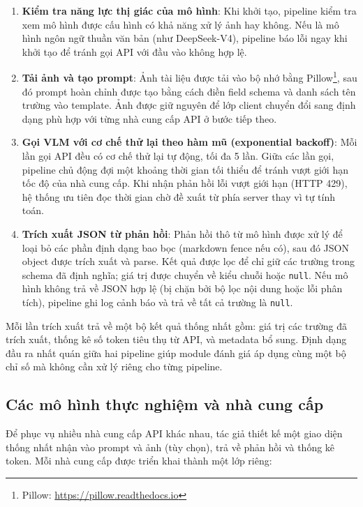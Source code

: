 ﻿\documentclass[12pt]{report}
\begin{document}
\begin{enumerate}
    \item \textbf{Kiểm tra năng lực thị giác của mô hình}: Khi khởi tạo, pipeline kiểm tra xem mô hình được cấu hình có khả năng xử lý ảnh hay không. Nếu là mô hình ngôn ngữ thuần văn bản (như DeepSeek-V4), pipeline báo lỗi ngay khi khởi tạo để tránh gọi API với đầu vào không hợp lệ.

    \item \textbf{Tải ảnh và tạo prompt}: Ảnh tài liệu được tải vào bộ nhớ bằng Pillow\footnote{Pillow: \url{https://pillow.readthedocs.io}}, sau đó prompt hoàn chỉnh được tạo bằng cách điền field schema và danh sách tên trường vào template. Ảnh được giữ nguyên để lớp client chuyển đổi sang định dạng phù hợp với từng nhà cung cấp API ở bước tiếp theo.

    \item \textbf{Gọi VLM với cơ chế thử lại theo hàm mũ (exponential backoff)}: Mỗi lần gọi API đều có cơ chế thử lại tự động, tối đa 5 lần. Giữa các lần gọi, pipeline chủ động đợi một khoảng thời gian tối thiểu để tránh vượt giới hạn tốc độ của nhà cung cấp. Khi nhận phản hồi lỗi vượt giới hạn (HTTP 429), hệ thống ưu tiên đọc thời gian chờ đề xuất từ phía server thay vì tự tính toán.

    \item \textbf{Trích xuất JSON từ phản hồi}: Phản hồi thô từ mô hình được xử lý để loại bỏ các phần định dạng bao bọc (markdown fence nếu có), sau đó JSON object được trích xuất và parse. Kết quả được lọc để chỉ giữ các trường trong schema đã định nghĩa; giá trị được chuyển về kiểu chuỗi hoặc \texttt{null}. Nếu mô hình không trả về JSON hợp lệ (bị chặn bởi bộ lọc nội dung hoặc lỗi phân tích), pipeline ghi log cảnh báo và trả về tất cả trường là \texttt{null}.
\end{enumerate}

Mỗi lần trích xuất trả về một bộ kết quả thống nhất gồm: giá trị các trường đã trích xuất, thống kê số token tiêu thụ từ API, và metadata bổ sung. Định dạng đầu ra nhất quán giữa hai pipeline giúp module đánh giá áp dụng cùng một bộ chỉ số mà không cần xử lý riêng cho từng pipeline.

\subsection{Các mô hình thực nghiệm và nhà cung cấp}\label{sec:vlm_models}

Để phục vụ nhiều nhà cung cấp API khác nhau, tác giả thiết kế một giao diện thống nhất nhận vào prompt và ảnh (tùy chọn), trả về phản hồi và thống kê token. Mỗi nhà cung cấp được triển khai thành một lớp riêng:
\end{document}
